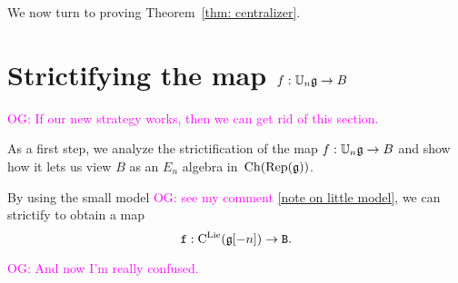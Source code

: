 \documentclass[11pt]{amsart}
\numberwithin{equation}{section}
\def\owen{\textcolor{magenta}{OG: }\textcolor{magenta}}
\begin{document}
%
%

We now turn to proving Theorem~\ref{thm: centralizer}.

\section{Strictifying the map $f: \mathbb U_n \mathfrak g \to B$}

\owen{If our new strategy works, then we can get rid of this section.}

As a first step, we analyze the strictification of the map $f: \mathbb U_n \mathfrak g \to B$ and show how it lets us view $B$ as an $E_n$ algebra in~${\rm Ch}({\rm Rep}(\mathfrak g))$.

By using the small model \owen{see my comment \ref{note on little model}}, we can strictify to obtain a map
\[
{\tt f}: {\rm C}^{\rm Lie}(\mathfrak g[-n]) \to {\tt B}.
\]

\owen{And now I'm really confused.}
\end{document}
